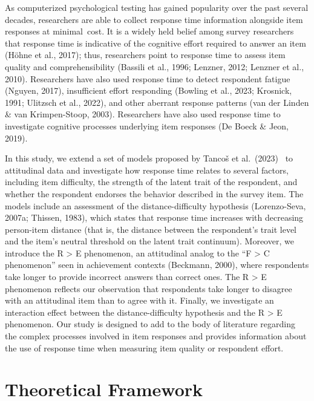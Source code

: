 \documentclass[
  number]{elsarticle}
\begin{document}
As computerized psychological testing has gained popularity over the
past several decades, researchers are able to collect response time
information alongside item responses at minimal~cost. It is a widely
held belief among survey researchers that response time is indicative of
the cognitive effort required to answer an item (Höhne et al., 2017);
thus, researchers point to response time to assess item quality and
comprehensibility (Bassili et al., 1996; Lenzner, 2012; Lenzner et al.,
2010). Researchers have also used response time to detect respondent
fatigue (Nguyen, 2017), insufficient effort responding (Bowling et al.,
2023; Krosnick, 1991; Ulitzsch et al., 2022), and other aberrant
response patterns (van der Linden \& van Krimpen-Stoop, 2003).
Researchers have also used response time to investigate cognitive
processes underlying item responses (De Boeck \& Jeon, 2019).

In this study, we extend a set of models proposed by Tancoš et
al.~(2023) ~to attitudinal data and investigate how response time
relates to several factors, including item difficulty, the strength of
the latent trait of the respondent, and whether the respondent endorses
the behavior described in the survey item. The models include an
assessment of the distance-difficulty hypothesis (Lorenzo-Seva, 2007a;
Thissen, 1983), which states that response time increases with
decreasing person-item distance (that is, the distance between the
respondent's trait level and the item's neutral threshold on the latent
trait continuum). Moreover, we introduce the R \textgreater{} E
phenomenon, an attitudinal analog to the ``F \textgreater{} C
phenomenon'' seen in achievement contexts (Beckmann, 2000), where
respondents take longer to provide incorrect answers than correct ones.
The R \textgreater{} E phenomenon reflects our observation that
respondents take longer to disagree with an attitudinal item than to
agree with it. Finally, we investigate an interaction effect between the
distance-difficulty hypothesis and the R \textgreater{} E phenomenon.
Our study is designed to add to the body of literature regarding the
complex processes involved in item responses and provides information
about the use of response time when measuring item quality or respondent
effort.

\section{Theoretical Framework}\label{theoretical-framework}
\end{document}
